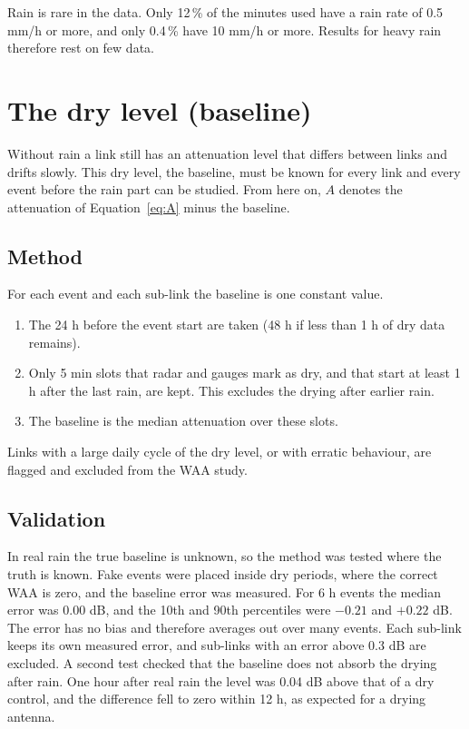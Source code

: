 \documentclass[11pt,a4paper]{article}
\begin{document}
Rain is rare in the data. Only 12\,\% of the minutes used have a rain rate of 0.5 mm/h or more, and only 0.4\,\% have 10 mm/h or
more. Results for heavy rain therefore rest on few data.

\section{The dry level (baseline)}
Without rain a link still has an attenuation level that differs between links and drifts slowly. This dry level, the
baseline, must be known for every link and every event before the rain part can be studied. From here on, $A$ denotes the
attenuation of Equation~\ref{eq:A} minus the baseline.

\subsection{Method}
For each event and each sub-link the baseline is one constant value.
\begin{enumerate}[leftmargin=1.5em]
\item The 24 h before the event start are taken (48 h if less than 1 h of dry data remains).
\item Only 5 min slots that radar and gauges mark as dry, and that start at least 1 h after the last rain, are kept. This
excludes the drying after earlier rain.
\item The baseline is the median attenuation over these slots.
\end{enumerate}
Links with a large daily cycle of the dry level, or with erratic behaviour, are flagged and excluded from the WAA study.

\subsection{Validation}
In real rain the true baseline is unknown, so the method was tested where the truth is known. Fake events were placed inside dry
periods, where the correct WAA is zero, and the baseline error was measured. For 6 h events the median error was 0.00 dB, and
the 10th and 90th percentiles were $-0.21$ and $+0.22$ dB. The error has no bias and therefore averages out over many events.
Each sub-link keeps its own measured error, and sub-links with an error above 0.3 dB are excluded. A second test checked that
the baseline does not absorb the drying after rain. One hour after real rain the level was 0.04 dB above that of a dry control,
and the difference fell to zero within 12 h, as expected for a drying antenna.
\end{document}
